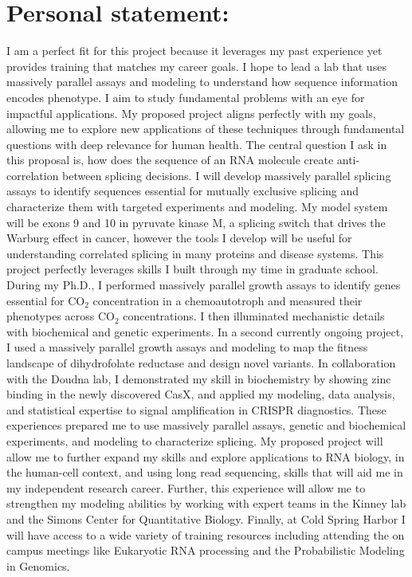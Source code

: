 \documentclass{article}
\begin{document}
\section*{Personal statement:}
I am a perfect fit for this project because it leverages my past experience yet provides training that matches my career goals.
I hope to lead a lab that uses massively parallel assays and modeling to understand how sequence information encodes phenotype.
I aim to study fundamental problems with an eye for impactful applications. 
My proposed project aligns perfectly with my goals, allowing me to explore new applications of these techniques through fundamental questions with deep relevance for human health.
The central question I ask in this proposal is, how does the sequence of an RNA molecule create anti-correlation between splicing decisions.
I will develop massively parallel splicing assays to identify sequences essential for mutually exclusive splicing and characterize them with targeted experiments and modeling.
My model system will be exons 9 and 10 in pyruvate kinase M, a splicing switch that drives the Warburg effect in cancer, however the tools I develop will be useful for understanding correlated splicing in many proteins and disease systems.
This project perfectly leverages skills I built through my time in graduate school.
During my Ph.D., I performed massively parallel growth assays to identify genes essential for CO$_2$ concentration in a chemoautotroph and measured their phenotypes across CO$_2$ concentrations.
I then illuminated mechanistic details with biochemical and genetic experiments. \supercite{Desmarais2019-yc,Flamholz2022-yo}
In a second currently ongoing project, I used a massively parallel growth assays and modeling to map the fitness landscape of dihydrofolate reductase and design novel variants.
In collaboration with the Doudna lab, I demonstrated my skill in biochemistry by showing zinc binding in the newly discovered CasX,\supercite{Liu2019-nk} and applied my modeling, data analysis, and statistical expertise to signal amplification in CRISPR diagnostics.\supercite{Liu2021-pu}
These experiences prepared me to use massively parallel assays, genetic and biochemical experiments, and modeling to characterize splicing. 
My proposed project will allow me to further expand my skills and explore applications to RNA biology, in the human-cell context, and using long read sequencing, skills that will aid me in my independent research career.
Further, this experience will allow me to strengthen my modeling abilities by working with expert teams in the Kinney lab and the Simons Center for Quantitative Biology.
Finally, at Cold Spring Harbor I will have access to a wide variety of training resources including attending the on campus meetings like Eukaryotic RNA processing and the Probabilistic Modeling in Genomics. 
\end{document}
